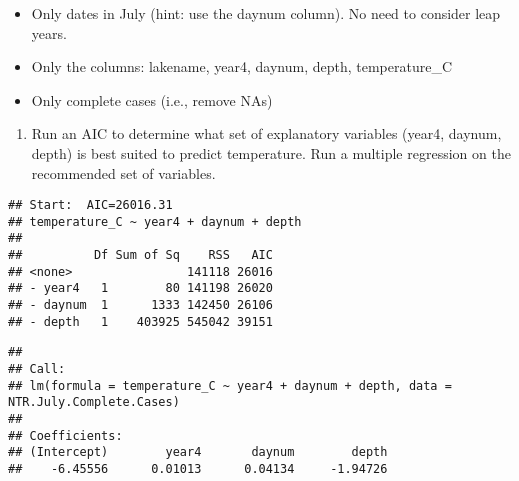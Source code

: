 \documentclass[]{article}
\newenvironment{Shaded}{\begin{snugshade}}{\end{snugshade}}
\newcommand{\CommentTok}[1]{\textcolor[rgb]{0.56,0.35,0.01}{\textit{#1}}}
\newcommand{\DataTypeTok}[1]{\textcolor[rgb]{0.13,0.29,0.53}{#1}}
\newcommand{\DecValTok}[1]{\textcolor[rgb]{0.00,0.00,0.81}{#1}}
\newcommand{\KeywordTok}[1]{\textcolor[rgb]{0.13,0.29,0.53}{\textbf{#1}}}
\newcommand{\NormalTok}[1]{#1}
\newcommand{\OperatorTok}[1]{\textcolor[rgb]{0.81,0.36,0.00}{\textbf{#1}}}
\newcommand{\StringTok}[1]{\textcolor[rgb]{0.31,0.60,0.02}{#1}}
\providecommand{\tightlist}{%
  \setlength{\itemsep}{0pt}\setlength{\parskip}{0pt}}
\begin{document}
\begin{itemize}
\tightlist
\item
  Only dates in July (hint: use the daynum column). No need to consider
  leap years.
\item
  Only the columns: lakename, year4, daynum, depth, temperature\_C
\item
  Only complete cases (i.e., remove NAs)
\end{itemize}

\begin{enumerate}
\def\labelenumi{\arabic{enumi}.}
\setcounter{enumi}{3}
\tightlist
\item
  Run an AIC to determine what set of explanatory variables (year4,
  daynum, depth) is best suited to predict temperature. Run a multiple
  regression on the recommended set of variables.
\end{enumerate}

\begin{Shaded}
\end{Shaded}

\begin{verbatim}
## Start:  AIC=26016.31
## temperature_C ~ year4 + daynum + depth
## 
##          Df Sum of Sq    RSS   AIC
## <none>                141118 26016
## - year4   1        80 141198 26020
## - daynum  1      1333 142450 26106
## - depth   1    403925 545042 39151
\end{verbatim}

\begin{verbatim}
## 
## Call:
## lm(formula = temperature_C ~ year4 + daynum + depth, data = NTR.July.Complete.Cases)
## 
## Coefficients:
## (Intercept)        year4       daynum        depth  
##    -6.45556      0.01013      0.04134     -1.94726
\end{verbatim}
\end{document}
